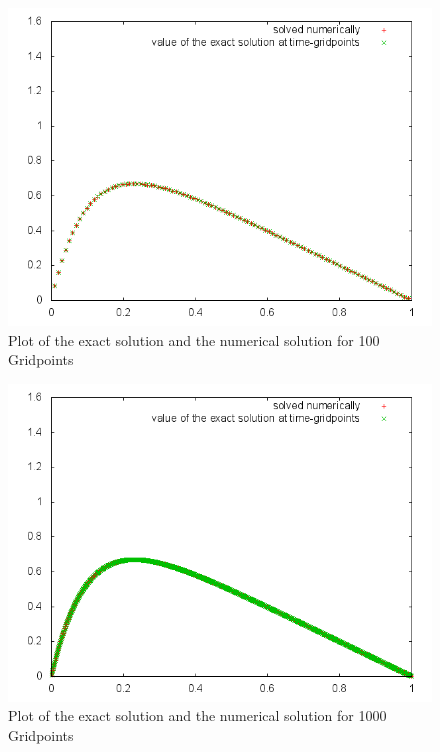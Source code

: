 \documentclass[10pt,a4paper]{article}
\begin{document}
\begin{figure}[h]
\centering
\includegraphics[scale=0.5]{Comparisonplot100.png}
\caption{Plot of the exact solution and the numerical solution for 100 Gridpoints}
\label{Comparison100}
\end{figure}

\begin{figure}[h]
\centering
\includegraphics[scale=0.5]{Comparisonplot1000.png}
\caption{Plot of the exact solution and the numerical solution for 1000 Gridpoints}
\label{Comparison1000}
\end{figure}
\end{document}
